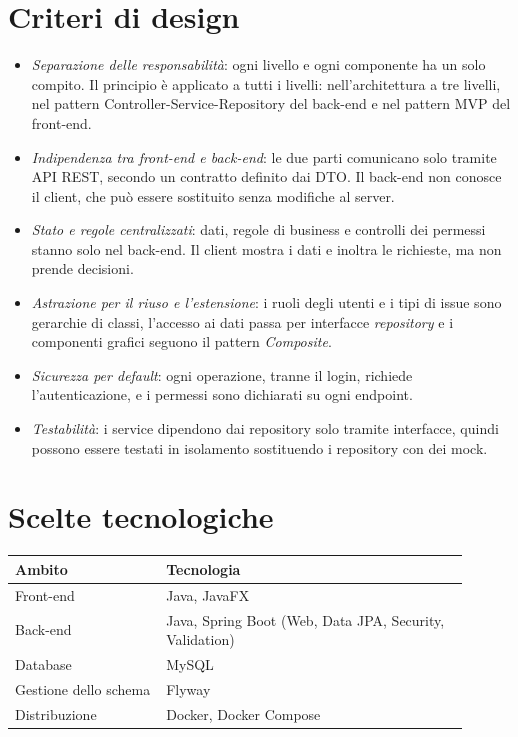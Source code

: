 \section{Criteri di design}
\begin{itemize}
  \item \textit{Separazione delle responsabilità}: ogni livello e ogni componente ha un solo compito. Il principio è applicato a tutti i livelli: nell'architettura a tre livelli, nel pattern Controller-Service-Repository del back-end e nel pattern MVP del front-end.
  \item \textit{Indipendenza tra front-end e back-end}: le due parti comunicano solo tramite API REST, secondo un contratto definito dai DTO. Il back-end non conosce il client, che può essere sostituito senza modifiche al server.
  \item \textit{Stato e regole centralizzati}: dati, regole di business e controlli dei permessi stanno solo nel back-end. Il client mostra i dati e inoltra le richieste, ma non prende decisioni.
  \item \textit{Astrazione per il riuso e l'estensione}: i ruoli degli utenti e i tipi di issue sono gerarchie di classi, l'accesso ai dati passa per interfacce \textit{repository} e i componenti grafici seguono il pattern \textit{Composite}.
  \item \textit{Sicurezza per default}: ogni operazione, tranne il login, richiede l'autenticazione, e i permessi sono dichiarati su ogni endpoint.
  \item \textit{Testabilità}: i service dipendono dai repository solo tramite interfacce, quindi possono essere testati in isolamento sostituendo i repository con dei mock.
\end{itemize}



\section{Scelte tecnologiche}

\begin{center}
\renewcommand{\arraystretch}{1.4}
\begin{tabular}{|p{0.3\linewidth}|p{0.6\linewidth}|}
\hline
\textbf{Ambito} & \textbf{Tecnologia} \\
\hline
Front-end & Java, JavaFX \\
Back-end & Java, Spring Boot (Web, Data JPA, Security, Validation) \\
Database & MySQL \\
Gestione dello schema & Flyway \\
Distribuzione & Docker, Docker Compose \\
\hline
\end{tabular}
\end{center}

